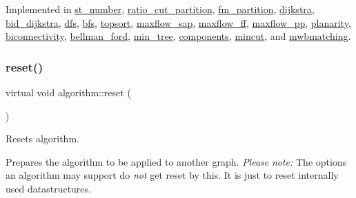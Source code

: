 Implemented in \mbox{\hyperlink{classst__number_a2aad4550b821c52d6998bff35fd8648f}{st\+\_\+number}}, \mbox{\hyperlink{classratio__cut__partition_a469c613c69db19cb63e492075346fea2}{ratio\+\_\+cut\+\_\+partition}}, \mbox{\hyperlink{classfm__partition_af72a9fcc300ab0f202168c819b089e5d}{fm\+\_\+partition}}, \mbox{\hyperlink{classdijkstra_a51ff4657e0ddb1ca5231a21e6dea1808}{dijkstra}}, \mbox{\hyperlink{classbid__dijkstra_a504aa04d114f27f2f886ee3b025ad95b}{bid\+\_\+dijkstra}}, \mbox{\hyperlink{classdfs_a1af70060897529e67910f589b047e576}{dfs}}, \mbox{\hyperlink{classbfs_aafdf63b57eaceb5d95f441be0f9c77bb}{bfs}}, \mbox{\hyperlink{classtopsort_a777a9a68c4081d22e7b698ed3c515343}{topsort}}, \mbox{\hyperlink{classmaxflow__sap_aa2974bf25fb597677848fdb23c12d338}{maxflow\+\_\+sap}}, \mbox{\hyperlink{classmaxflow__ff_a4d0deee7d70bac4c9dad942341d87e37}{maxflow\+\_\+ff}}, \mbox{\hyperlink{classmaxflow__pp_a7ea24bd88999718e5e4e28ac028131cd}{maxflow\+\_\+pp}}, \mbox{\hyperlink{classplanarity_ae06c471d957a116aad14e338c341f8b1}{planarity}}, \mbox{\hyperlink{classbiconnectivity_a65e0e821f5e9ce8d210648d462fd2cfa}{biconnectivity}}, \mbox{\hyperlink{classbellman__ford_a9da2fb7d20ef1f726ee935474302d80b}{bellman\+\_\+ford}}, \mbox{\hyperlink{classmin__tree_ad87b1bfbc687ad943c07538fa0c3d270}{min\+\_\+tree}}, \mbox{\hyperlink{classcomponents_aeeda901d02c65d6c31c8b6148540d7c1}{components}}, \mbox{\hyperlink{classmincut_a3a06737106ab6000360a1f799361691a}{mincut}}, and \mbox{\hyperlink{classmwbmatching_af6b9e6ad6e77958ddd32301df96bae23}{mwbmatching}}.

\mbox{\label{classalgorithm_a21aba63d066ae7897de6ca7d8425c408}} 
\subsubsection{\texorpdfstring{reset()}{reset()}}
{\footnotesize\ttfamily virtual void algorithm\+::reset (\begin{DoxyParamCaption}{ }\end{DoxyParamCaption})\hspace{0.3cm}{\ttfamily [pure virtual]}}



Resets algorithm. 

Prepares the algorithm to be applied to another graph. {\itshape Please} {\itshape note\+:} The options an algorithm may support do {\itshape not} get reset by this. It is just to reset internally used datastructures. 

